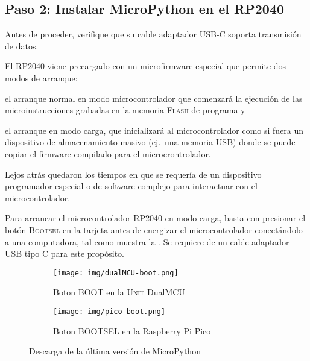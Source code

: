 %
%



\subsection{Paso 2: Instalar MicroPython en el RP2040}%
\label{sec:step2}
Antes de proceder, verifique que su cable adaptador USB-C soporta transmisión de datos.

\medskip{}

El RP2040 viene precargado con un microfirmware especial que permite dos modos de arranque:
\begin{enumerate*}[label=\roman*\rpar]
	\item el arranque normal en modo microcontrolador que comenzará la ejecución de las microinstrucciones grabadas en la memoria \textsc{Flash} de programa
	y
	\item el arranque en modo carga, que inicializará al microcontrolador como si fuera un dispositivo de almacenamiento masivo (ej.~una memoria USB) donde se puede copiar el firmware compilado para el microcrontrolador.
\end{enumerate*}
Lejos atrás quedaron los tiempos en que se requería de un dispositivo programador especial o de software complejo para interactuar con el microcontrolador.

Para arrancar el microcontrolador RP2040 en modo carga, basta con presionar el botón \textsc{Bootsel} en la tarjeta antes de energizar el microcontrolador conectándolo a una computadora, tal como muestra la .
Se requiere de un cable adaptador USB tipo C para este propósito.

\begin{figure}[H]
	\centering%
	\begin{subfigure}[b]{0.45\textwidth}
		\centering%
		\texttt{[image: img/dualMCU-boot.png]} %
		\caption{Boton BOOT en la \textsc{Unit} DualMCU}
		\label{fig:dualMCU-boot} %
	\end{subfigure}
	\hfill
	\begin{subfigure}[b]{0.45\textwidth}
		\centering%
		\texttt{[image: img/pico-boot.png]} %
		\caption{Boton BOOTSEL en la Raspberry Pi Pico}
		\label{fig:pico-boot} %
	\end{subfigure}
	\caption{Descarga de la última versión de MicroPython}
	\label{fig:boot-btn} %
\end{figure}

